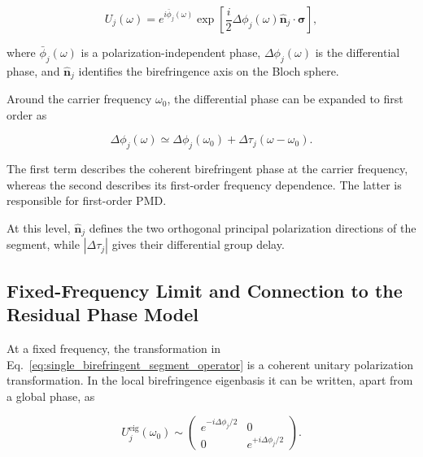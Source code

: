 \begin{equation}
U_j(\omega)
=
e^{i\bar{\phi}_j(\omega)}
\exp
\left[
\frac{i}{2}
\Delta\phi_j(\omega)
\hat{\mathbf{n}}_j
\cdot
\boldsymbol{\sigma}
\right],
\label{eq:single_birefringent_segment_operator}
\end{equation}

where \(\bar{\phi}_j(\omega)\) is a polarization-independent phase,
\(\Delta\phi_j(\omega)\) is the differential phase, and
\(\hat{\mathbf{n}}_j\) identifies the birefringence axis on the Bloch sphere.

Around the carrier frequency \(\omega_0\), the differential phase can be expanded
to first order as

\begin{equation}
\Delta\phi_j(\omega)
\simeq
\Delta\phi_j(\omega_0)
+
\Delta\tau_j
(\omega-\omega_0).
\label{eq:first_order_differential_phase}
\end{equation}

The first term describes the coherent birefringent phase at the carrier
frequency, whereas the second describes its first-order frequency dependence.
The latter is responsible for first-order PMD.

At this level, \(\hat{\mathbf n}_j\) defines the two orthogonal principal
polarization directions of the segment, while \( |\Delta\tau_j| \) gives their
differential group delay.



\subsection{Fixed-Frequency Limit and Connection to the Residual Phase Model}
\label{subsec:fixed_frequency_birefringence_residual_phase}

At a fixed frequency, the transformation in
Eq.~\eqref{eq:single_birefringent_segment_operator} is a coherent unitary
polarization transformation. In the local birefringence eigenbasis it can be
written, apart from a global phase, as

\begin{equation}
U_j^{\mathrm{eig}}(\omega_0)
\sim
\begin{pmatrix}
e^{-i\Delta\phi_j/2} & 0\\
0 & e^{+i\Delta\phi_j/2}
\end{pmatrix}.
\label{eq:fixed_frequency_eigenbasis_operator}
\end{equation}

